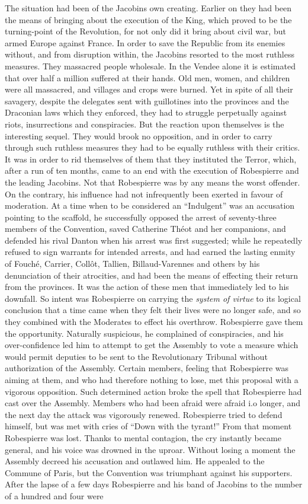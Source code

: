 \documentclass{book}
\begin{document}
The situation had been of the Jacobins own creating. Earlier on they had been the means of bringing about the execution of the King, which proved to be the turning-point of the Revolution, for not only did it bring about civil war, but armed Europe against France. In order to save the Republic from its enemies without, and from disruption within, the Jacobins resorted to the most ruthless measures. They massacred people wholesale. In the Vendee alone it is estimated that over half a million suffered at their hands. Old men, women, and children were all massacred, and villages and crops were burned. Yet in spite of all their savagery, despite the delegates sent with guillotines into the provinces and the Draconian laws which they enforced, they had to struggle perpetually against riots, insurrections and conspiracies. But the reaction upon themselves is the interesting sequel. They would brook no opposition, and in order to carry through such ruthless measures they had to be equally ruthless with their critics. It was in order to rid themselves of them that they instituted the Terror, which, after a run of ten months, came to an end with the execution of Robespierre and the leading Jacobins. Not that Robespierre was by any means the worst offender. On the contrary, his influence had not infrequently been exerted in favour of moderation. At a time when to be considered an “Indulgent” was an accusation pointing to the scaffold, he successfully opposed the arrest of seventy-three members of the Convention, saved Catherine Théot and her companions, and defended his rival Danton when his arrest was first suggested; while he repeatedly refused to sign warrants for intended arrests, and had earned the lasting enmity of Fouché, Carrier, Collôt, Tallien, Billaud-Varennes and others by his denunciation of their atrocities, and had been the means of effecting their return from the provinces. It was the action of these men that immediately led to his downfall. So intent was Robespierre on carrying the \emph{system of virtue} to its logical conclusion that a time came when they felt their lives were no longer safe, and so they combined with the Moderates to effect his overthrow. Robespierre gave them the opportunity. Naturally suspicious, he complained of conspiracies, and his over-confidence led him to attempt to get the Assembly to vote a measure which would permit deputies to be sent to the Revolutionary Tribunal without authorization of the Assembly. Certain members, feeling that Robespierre was aiming at them, and who had therefore nothing to lose, met this proposal with a vigorous opposition. Such determined action broke the spell that Robespierre had cast over the Assembly. Members who had been afraid were afraid i.o longer, and the next day the attack was vigorously renewed. Robespierre tried to defend himself, but was met with cries of “Down with the tyrant!” From that moment Robespierre was lost. Thanks to mental contagion, the cry instantly became general, and his voice was drowned in the uproar. Without losing a moment the Assembly decreed his accusation and outlawed him. He appealed to the Commune of Paris, but the Convention was triumphant against his supporters. After the lapse of a few days Robespierre and his band of Jacobins to the number of a hundred and four were 
\end{document}
